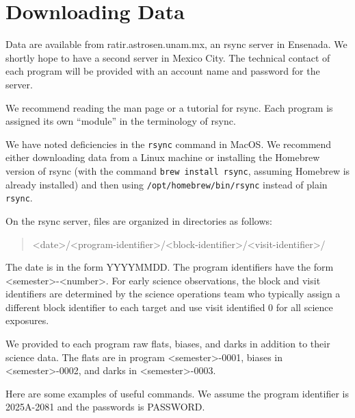 \section{Downloading Data}

Data are available from ratir.astrosen.unam.mx, an rsync server in Ensenada. We shortly hope to have a second server in Mexico City. The technical contact of each program will be provided with an account name and password for the server.

We recommend reading the man page or a tutorial for rsync. Each program is assigned its own “module” in the terminology of rsync. 

We have noted deficiencies in the \verb|rsync| command in MacOS. We recommend either downloading data from a Linux machine or installing the Homebrew version of rsync (with the command \verb|brew install rsync|, assuming Homebrew is already installed) and then using \verb|/opt/homebrew/bin/rsync| instead of plain \verb|rsync|.

On the rsync server, files are organized in directories as follows:
\begin{quote}
<date>/<program-identifier>/<block-identifier>/<visit-identifier>/
\end{quote}

The date is in the form YYYYMMDD. The program identifiers have the form <semester>-<number>. For early science observations, the block and visit identifiers are determined by the science operations team who typically assign a different block identifier to each target and use visit identified 0 for all science exposures.

We provided to each program raw flats, biases, and darks in addition to their science data. The flats are in program <semester>-0001, biases in <semester>-0002, and darks in <semester>-0003.

Here are some examples of useful commands. We assume the program identifier is 2025A-2081 and the passwords is PASSWORD.

